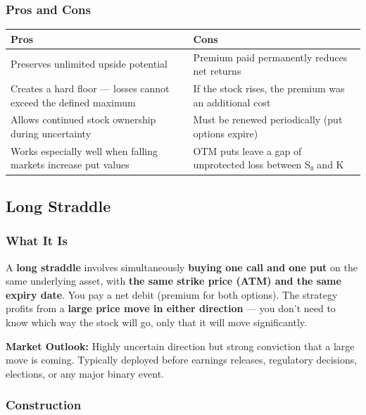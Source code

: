 \documentclass[12pt,openany]{book}
\begin{document}
\subsubsection{Pros and Cons}

\begin{center}
\scriptsize
\setlength{\tabcolsep}{3pt}
\begin{tabular}{|L{6.00cm}|L{6.00cm}|}
\hline
Pros & Cons \\
\hline
Preserves unlimited upside potential & Premium paid permanently reduces net returns \\
\hline
Creates a hard floor — losses cannot exceed the defined maximum & If the stock rises, the premium was an additional cost \\
\hline
Allows continued stock ownership during uncertainty & Must be renewed periodically (put options expire) \\
\hline
Works especially well when falling markets increase put values & OTM puts leave a gap of unprotected loss between S₀ and K \\
\hline
\end{tabular}
\end{center}



\subsection{Long Straddle}

\subsubsection{What It Is}

A \textbf{long straddle} involves simultaneously \textbf{buying one call and one put} on the same underlying asset, with \textbf{the same strike price (ATM) and the same expiry date}. You pay a net debit (premium for both options). The strategy profits from a \textbf{large price move in either direction} — you don't need to know which way the stock will go, only that it will move significantly.

\textbf{Market Outlook:} Highly uncertain direction but strong conviction that a large move is coming. Typically deployed before earnings releases, regulatory decisions, elections, or any major binary event.



\subsubsection{Construction}
\end{document}
